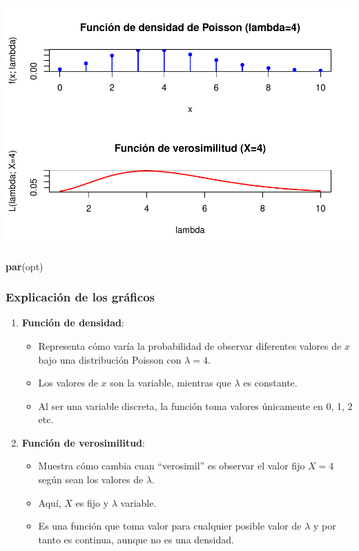 \documentclass[
]{article}
\newenvironment{Shaded}{\begin{snugshade}}{\end{snugshade}}
\newcommand{\FunctionTok}[1]{\textcolor[rgb]{0.13,0.29,0.53}{\textbf{#1}}}
\newcommand{\NormalTok}[1]{#1}
\providecommand{\tightlist}{%
  \setlength{\itemsep}{0pt}\setlength{\parskip}{0pt}}
\begin{document}
\includegraphics{EjerciciosInferenciaEstadistica_files/figure-latex/unnamed-chunk-48-1.pdf}

\begin{Shaded}
\begin{Highlighting}[]
\FunctionTok{par}\NormalTok{(opt)}
\end{Highlighting}
\end{Shaded}

\subsubsection{Explicación de los gráficos}\label{explicaciuxf3n-de-los-gruxe1ficos}

\begin{enumerate}
\def\labelenumi{\arabic{enumi}.}
\tightlist
\item
  \textbf{Función de densidad}:

  \begin{itemize}
  \tightlist
  \item
    Representa cómo varía la probabilidad de observar diferentes valores de \(x\) bajo una distribución Poisson con \(\lambda = 4\).
  \item
    Los valores de \(x\) son la variable, mientras que \(\lambda\) es constante.
  \item
    Al ser una variable discreta, la función toma valores únicamente en 0, 1, 2 etc.
  \end{itemize}
\item
  \textbf{Función de verosimilitud}:

  \begin{itemize}
  \tightlist
  \item
    Muestra cómo cambia cuan ``verosimil'' es observar el valor fijo \(X = 4\) según sean los valores de \(\lambda\).
  \item
    Aquí, \(X\) es fijo y \(\lambda\) variable.
  \item
    Es una función que toma valor para cualquier posible valor de \(\lambda\) y por tanto es continua, aunque no es una densidad.
  \end{itemize}
\end{enumerate}
\end{document}
